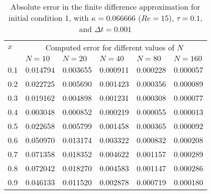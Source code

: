 \documentclass[undefended]{sfuthesis}
\begin{document}
\begin{table}[!h]%
	\centering
	\begin{threeparttable}
		\caption{Absolute error in the finite difference approximation for initial condition 1, with $\kappa = 0.066666$ ($Re = 15$), $\tau = 0.1$, and $\Delta t = 0.001$}
		\begin{tabular}{p{.13\linewidth} p{.15\linewidth} p{.15\linewidth} p{.15\linewidth} p{.15\linewidth} p{.1\linewidth}}
			\toprule
			$x$ & \multicolumn{5}{c}{Computed error for different values of $N$}\\
			\cmidrule{2-6}
			& $N = 10$ & $N = 20$ & $N = 40$ & $N = 80$ & $N = 160$ \\
			\midrule
			0.1 & 0.014794 & 0.003655 & 0.000911 & 0.000228 & 0.000057 \\
			0.2 & 0.022725 & 0.005690 & 0.001423 & 0.000356 & 0.000089 \\
			0.3 & 0.019162 & 0.004898 & 0.001231 & 0.000308 & 0.000077 \\
			0.4 & 0.003048 & 0.000852 & 0.000219 & 0.000055 & 0.000013 \\
			0.5 & 0.022658 & 0.005799 & 0.001458 & 0.000365 & 0.000092 \\
			0.6 & 0.050970 & 0.013174 & 0.003322 & 0.000832 & 0.000208 \\
			0.7 & 0.071358 & 0.018352 & 0.004622 & 0.001157 & 0.000289 \\
			0.8 & 0.072042 & 0.018270 & 0.004583 & 0.001147 & 0.000286 \\
			0.9 & 0.046133 & 0.011520 & 0.002878 & 0.000719 & 0.000180 \\
			\bottomrule
		\end{tabular}
	\end{threeparttable}
\end{table}
\end{document}
